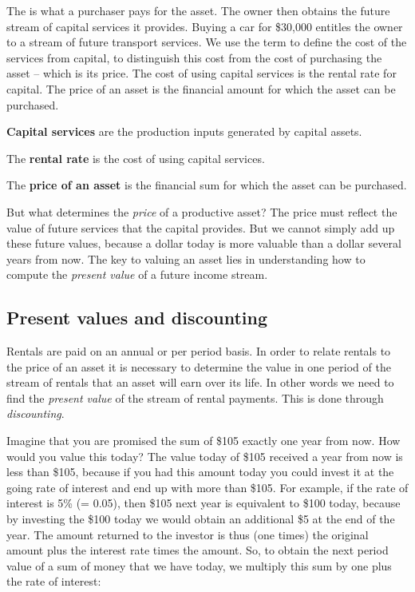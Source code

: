 The  is what a purchaser pays for the asset. The owner then obtains the future stream of capital services it provides. Buying a car for \$30,000 entitles the owner to a stream of future transport services. We use the term  to define the cost of the services from capital, to distinguish this cost from the cost of purchasing the asset -- which is its price. The cost of using capital services is the rental rate for capital. The price of an asset is the financial amount for which the asset can be purchased.

\begin{DefBox}
\textbf{Capital services} are the production inputs generated by capital assets.

The \textbf{rental rate} is the cost of using capital services.

The \textbf{price of an asset} is the financial sum for which the asset can be purchased.
\end{DefBox}

But what determines the \textit{price} of a productive asset? The price must reflect the value of future services that the capital provides. But we cannot simply add up these future values, because a dollar today is more valuable than a dollar several years from now. The key to valuing an asset lies in understanding how to compute the \textit{present value} of a future income stream.

\subsection*{Present values and discounting}

Rentals are paid on an annual or per period basis. In order to relate rentals to the price of an asset it is necessary to determine the value in one period of the stream of rentals that an asset will earn over its life. In other words we need to find the \textit{present value} of the stream of rental payments. This is done through \textit{discounting}. 

Imagine that you are promised the sum of \$105 exactly one year from now. How would you value this today? The value today of \$105 received a year from now is less than \$105, because if you had this amount today you could invest it at the going rate of interest and end up with more than \$105. For example, if the rate of interest is 5\% (= 0.05), then \$105 next year is equivalent to \$100 today, because by investing the \$100 today we would obtain an additional \$5 at the end of the year. The amount returned to the investor is thus (one times) the original amount plus the interest rate times the amount. So, to obtain the next period value of a sum of money that we have today, we multiply this sum by one plus the rate of interest: 

